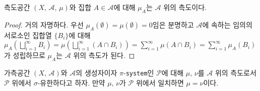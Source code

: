\begin{proposition}
    측도공간 $(X,\,\mathcal{A},\,\mu)$와 집합 $A\in\mathcal{A}$에 대해 $\mu_A$는 $\mathcal{A}$ 위의 측도이다.
\end{proposition}

\begin{proof}
    거의 자명하다. 우선 $\mu_A(\emptyset)=\mu(\emptyset)=0$임은 분명하고 $\mathcal{A}$에 속하는 임의의 서로소인 집합열 $\{B_i\}$에 대해 $\mu_A(\bigsqcup_{i=1}^\infty B_i)=\mu(\bigsqcup_{i=1}^\infty(A\cap B_i))=\sum_{i=1}^\infty\mu(A\cap B_i)=\sum_{i=1}^\infty\mu_A(B_i)$가 성립하므로 $\mu_A$는 $\mathcal{A}$ 위의 측도가 된다.
\end{proof}

\begin{theorem}\label{thm:measureUnique}
    가측공간 $(X,\,\mathcal{A})$와 $\mathcal{A}$의 생성자이자 $\pi$-\texttt{system}인 $\mathcal{P}$에 대해 $\mu,\,\nu$를 $\mathcal{A}$ 위의 측도로서 $\mathcal{P}$ 위에서 $\sigma$-유한하다고 하자. 만약 $\mu,\,\nu$가 $\mathcal{P}$ 위에서 일치하면 $\mu=\nu$이다.
\end{theorem}

